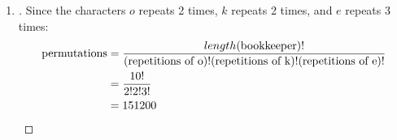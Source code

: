 \documentclass[paper=usletter, fontsize=12pt]{article}
\begin{document}
\begin{enumerate}
\begin{enumerate}
            \item
            \begin{proof}[\unskip\nopunct]
                Since the characters $o$ repeats 2 times, $k$ repeats 2 times,
                and $e$ repeats 3 times:
                \begingroup
                \addtolength{\jot}{1em}
                \begin{align*}
                    \text{permutations} & =
                    \frac{length(\text{bookkeeper})!}{(\text{repetitions of
                    o})!(\text{repetitions of k})!(\text{repetitions of e})!}
                    \\ & = \frac{10!}{2!2!3!} \\ & = 151200 \qedhere
                \end{align*}
                \endgroup
            \end{proof}
            \vspace{0.2in}

        \end{enumerate}

    \end{enumerate}
\end{document}
